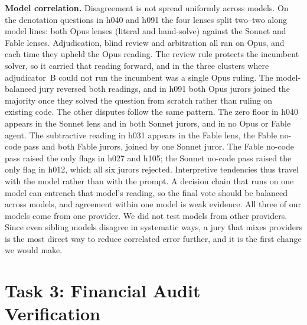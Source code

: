 \documentclass[conference]{IEEEtran}
\begin{document}
\textbf{Model correlation.} Disagreement is not spread uniformly across models. On the denotation questions in h040
and h091 the four
lenses split two--two along model lines: both Opus lenses (literal and hand-solve) against the Sonnet and Fable
lenses. Adjudication, blind review and arbitration all ran on Opus, and each time they upheld the Opus reading. The
review rule protects the incumbent solver, so it carried that reading forward, and in the three clusters where
adjudicator~B could not run the incumbent was a single Opus ruling. The
model-balanced jury reversed both readings, and in h091 both Opus jurors joined the majority once they solved the
question
from scratch rather than ruling on existing code. The other disputes follow the same pattern. The zero floor in h040
appears in the Sonnet lens and in both Sonnet jurors, and in no Opus or Fable agent. The subtractive reading in h031
appears in the Fable lens, the Fable no-code pass and both Fable jurors, joined by one Sonnet juror. The Fable no-code
pass raised the only flags in h027 and h105; the Sonnet no-code pass raised the only flag in h012, which all six
jurors rejected. Interpretive tendencies thus travel with the model rather than with the prompt. A decision chain
that runs on one model can entrench that model's reading, so the final vote should be balanced across
models, and agreement within one model is weak evidence. All three of our models come from one provider. We did not
test models from other providers. Since even sibling models disagree in systematic ways, a jury that mixes providers
is the most direct way to reduce correlated error further, and it is the first change we would make.

\section{Task 3: Financial Audit Verification}\label{sec:task3}
\end{document}
